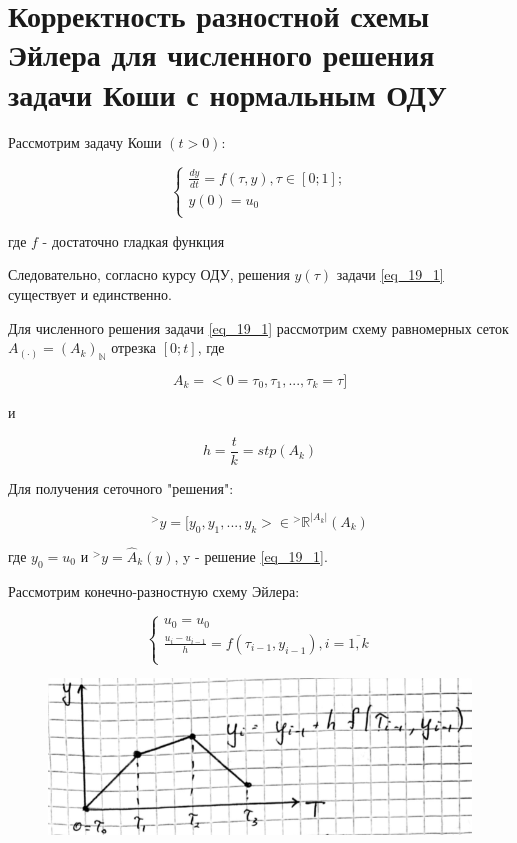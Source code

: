 \documentclass[__main__.tex]{subfiles}
\begin{document}
\section{Корректность разностной схемы Эйлера для численного решения задачи Коши с нормальным ОДУ}

Рассмотрим задачу Коши $(t > 0)$:

\begin{equation}
\label{eq_19_1}
\begin{cases}
\frac{dy}{dt} = f(\tau, y), \tau \in [0;1];\\
y(0) = u_0\\
\end{cases}
\end{equation}

где $f$ - достаточно гладкая функция 

Следовательно, согласно курсу ОДУ, решения $y(\tau)$ задачи \ref{eq_19_1} существует и единственно. 

Для численного решения задачи \ref{eq_19_1} рассмотрим схему равномерных сеток $A_{(\cdot)} = (A_k)_{\mathbb{N}}$ отрезка $[0; t]$, где  

$$A_k = <0 = \tau_0, \tau_1, ..., \tau_k = \tau]$$

и 

$$h = \frac{t}{k} = stp(A_k)$$

Для получения сеточного "решения":

$${}^{>}y = [y_0, y_1, ..., y_k> \in {}^{>}\mathbb{R}^{|A_k|}(A_k)$$

где $y_0 = u_0$ и ${}^{>}y = \hat{A}_k(y)$, y - решение \ref{eq_19_1}.

Рассмотрим конечно-разностную схему Эйлера:

\begin{equation}
\label{eq_19_3}
\begin{cases}
u_0 = u_0\\
\frac{u_i - u_{i - 1}}{h} = f(\tau_{i - 1} , y_{i - 1}), i = \overline{1, k}\\
\end{cases}
\end{equation}

\begin{figure}[h!]
	\centering
	\includegraphics[width=0.5\linewidth]{img/img_19-1}
	\label{img_19.1}
\end{figure}
\end{document}
